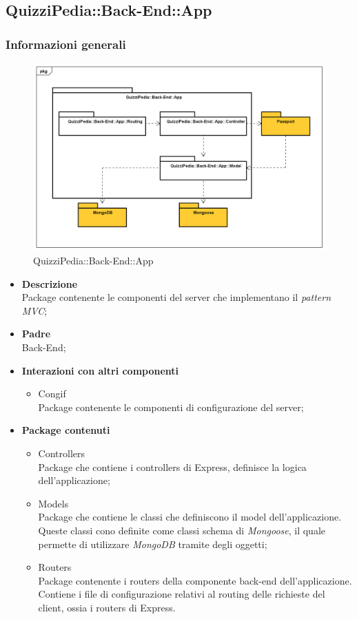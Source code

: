 \subsection{QuizziPedia::Back-End::App}
\subsubsection{Informazioni generali}
\label{QuizziPedia::Back-End::App}
\begin{figure}
	\centering
	\includegraphics[scale=0.45]{UML/Package/QuizziPedia_Back-End_App.png}
	\caption{QuizziPedia::Back-End::App}
\end{figure}
\FloatBarrier
	\begin{itemize}
		\item \textbf{Descrizione} \\
		Package contenente le componenti del server che implementano il \textit{pattern\ped{G} MVC};
		\item \textbf{Padre} \\ Back-End;
		\item \textbf{Interazioni con altri componenti}
			\begin{itemize}
				\item Congif \\
				Package contenente le componenti di configurazione del server;
			\end{itemize}
		\item \textbf{Package contenuti}
			\begin{itemize}
				\item Controllers \\
				Package che contiene i controllers di Express, definisce la logica dell'applicazione;
				\item Models \\
				Package che contiene le classi che definiscono il model dell'applicazione. Queste classi cono definite come classi schema di \textit{Mongoose}, il quale permette di utilizzare \textit{MongoDB} tramite degli oggetti;
				\item Routers \\
				Package contenente i routers della componente back-end dell'applicazione. Contiene i file di configurazione relativi al routing delle richieste del client, ossia i routers di Express.
			\end{itemize}
	\end{itemize}